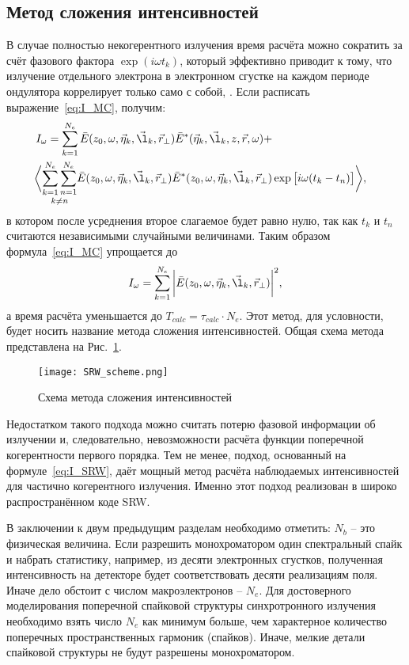 \subsection{Метод сложения интенсивностей}
В случае полностью некогерентного излучения время расчёта можно сократить за счёт фазового фактора $\exp{(i \omega t_k)}$, который эффективно приводит к тому, что излучение отдельного электрона в электронном сгустке на каждом периоде ондулятора коррелирует только само с собой, \cite{geloni_transverse_2008}. Если расписать выражение~\ref{eq:I_MC}, получим: 
\begin{align}
	I_{\omega} = \sum\limits_{k=1}^{N_e} \bar{E}(z_0, \omega, \vec{\eta}_k, \vec{\l}_k, \vec{r}_{\bot})\bar{E}^{*}(\vec{\eta}_k, \vec{\l}_k, z, \vec{r}, \omega) + \cr
	\bigg \langle \underset{k \neq n}{\sum\limits_{k=1}^{N_e} \sum\limits_{n=1}^{N_e}} \bar{E}(z_0, \omega, \vec{\eta}_k, \vec{\l}_k, \vec{r}_{\bot})\bar{E}^{*}(z_0, \omega, \vec{\eta}_k, \vec{\l}_k, \vec{r}_{\bot}) & \exp{\big[i \omega (t_k - t_n)\big]}\bigg \rangle,
	\label{eq:I_SRW_with_explicit_sum} 
\end{align}
в котором после усреднения второе слагаемое будет равно нулю, так как $t_k$ и $t_n$ считаются независимыми случайными величинами. Таким образом формула~\ref{eq:I_MC} упрощается до 
\begin{align}
 	I_{\omega} = \sum\limits_{k=1}^{N_e} \bigg|\bar{E}(z_0, \omega, \vec{\eta}_k, \vec{\l}_k, \vec{r}_{\bot})\bigg|^2,
 	\label{eq:I_SRW} 
\end{align}
а время расчёта уменьшается до $T_{calc} = \tau_{calc} \cdot N_e$. Этот метод, для условности, будет носить название метода сложения интенсивностей. Общая схема метода представлена на Рис.~\ref{fig:SRW_scheme}.
\begin{figure}[H] 
	\centering 	\texttt{[image: SRW\_scheme.png]}
	\caption{Схема метода сложения интенсивностей}
	\label{fig:SRW_scheme}
\end{figure}
\noindent  Недостатком такого подхода можно считать потерю фазовой информации об излучении и, следовательно, невозможности расчёта функции поперечной когерентности первого порядка. Тем не менее, подход, основанный на формуле~\ref{eq:I_SRW}, даёт мощный метод расчёта наблюдаемых интенсивностей для частично когерентного излучения. Именно этот подход реализован в широко распространённом коде SRW.

В заключении к двум предыдущим разделам необходимо отметить: $N_b$ -- это физическая величина. Если разрешить монохроматором один спектральный спайк и набрать статистику, например, из десяти электронных сгустков, полученная интенсивность на детекторе будет соответствовать десяти реализациям поля. Иначе дело обстоит с числом макроэлектронов -- $N_e$. Для достоверного моделирования поперечной спайковой структуры синхротронного излучения необходимо взять число $N_e$ как минимум больше, чем характерное количество поперечных пространственных гармоник (спайков). Иначе, мелкие детали спайковой структуры не будут  разрешены монохроматором.
  
